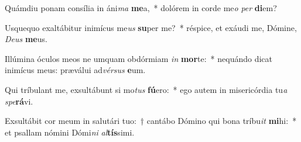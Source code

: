 \item Quámdiu ponam consília in áni\textit{ma} \textbf{me}a,~* dolórem in corde me\textit{o} \textit{per} \textbf{di}em?
\item Usquequo exaltábitur inimícus me\textit{us} \textbf{su}per me?~* réspice, et exáudi me, Dómine, \textit{De}\textit{us} \textbf{me}us.
\item Illúmina óculos meos ne umquam obdórmiam \textit{in} \textbf{mor}te:~* nequándo dicat inimícus meus: præválui ad\textit{vér}\textit{sus} \textbf{e}um.
\item Qui tríbulant me, exsultábunt si mo\textit{tus} \textbf{fú}ero:~* ego autem in misericórdia tu\textit{a} \textit{spe}\textbf{rá}vi.
\item Exsultábit cor meum in salutári tuo:~† cantábo Dómino qui bona tríbu\textit{it} \textbf{mi}hi:~* et psallam nómini Dómi\textit{ni} \textit{al}\textbf{tís}simi.
